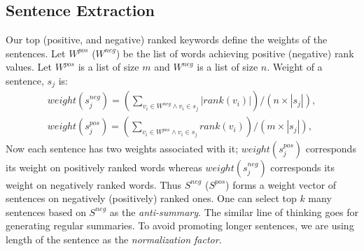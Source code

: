 \documentclass[a4paper]{report}
\begin{document}
\subsection{Sentence Extraction}
Our top (positive, and negative) ranked keywords define the weights of the sentences. Let $W^{pos}$ ($W^{neg}$) be the list of words achieving positive (negative) rank values. Let $W^{pos}$ is a list of size $m$ and $W^{neg}$ is a list of size $n$.%
Weight of a sentence, $s_j$ is:
\begin{subequations}
\begin{align}
weight(s_j^{neg}) = (\sum_{v_i \in W^{neg} \wedge v_i \in s_j}|rank({v_i})|) / (n \times |s_j|),\\
weight(s_j^{pos}) = (\sum_{v_i \in W^{pos} \wedge v_i \in s_j }rank({v_i})) / (m \times |s_j|),
\end{align}
\end{subequations}
Now each sentence has two weights associated with it; $weight(s_j^{pos})$ corresponds its weight on positively ranked words whereas 
$weight(s_j^{neg})$ corresponds its weight on negatively ranked words. Thus $S^{neg}$ ($S^{pos}$) forms a weight vector of sentences on negatively (positively) ranked ones.
One can select top $k$ many sentences based on $S^{neg}$ as the {\em anti-summary}. The similar line of thinking goes for generating regular summaries. To avoid promoting longer sentences, we are using length of the sentence as the \emph{normalization factor}.
\begin{table}[h]
\begin{centering}
\caption{Sample of top sentences}
\label{table:finalSents}
\end{centering}
\end{table}
\end{document}
